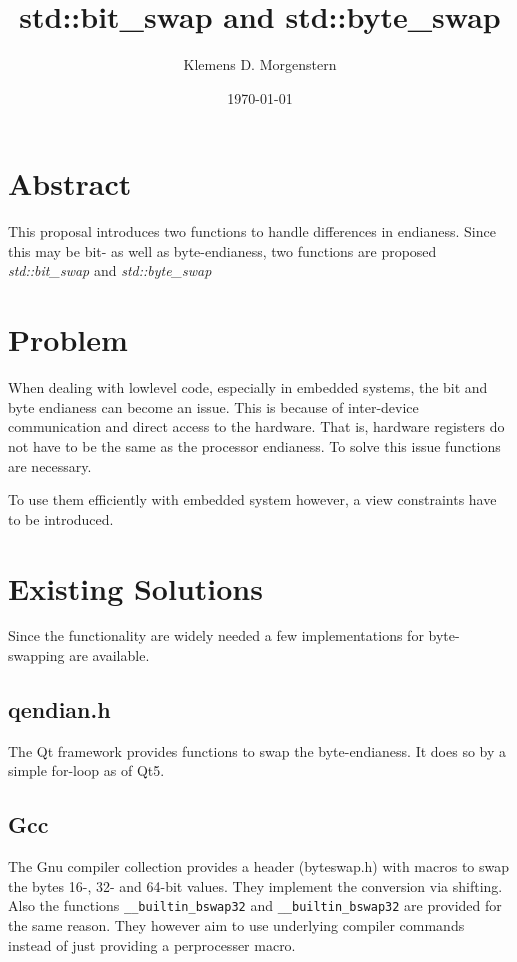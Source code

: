 \documentclass{article}
\begin{document}
\title{std::bit\_swap and std::byte\_swap}
\author{Klemens D. Morgenstern}
\date{\today}

\maketitle

\newpage
\section*{Abstract}

This proposal introduces two functions to handle differences in endianess. Since
this may be bit- as well as byte-endianess, two functions are proposed
\textit{std::bit\_swap} and \textit{std::byte\_swap}

\section{Problem}

When dealing with lowlevel code, especially in embedded systems, the bit and
byte endianess can become an issue. This is because of inter-device
communication and direct access to the hardware. That is, hardware registers do not have to
be the same as the processor endianess. To solve this issue functions are
necessary.

To use them efficiently with embedded system however, a view constraints have
to be introduced.

\section{Existing Solutions}
Since the functionality are widely needed a few implementations for
byte-swapping are available.

\subsection{qendian.h} 
The Qt framework provides functions to swap the byte-endianess. It does so by a
simple for-loop as of Qt5.

\subsection{Gcc}
The Gnu compiler collection provides a header (byteswap.h) with macros to swap
the bytes 16-, 32- and 64-bit values. They implement the conversion via shifting.
Also the functions \lstinline {__builtin_bswap32} and
\lstinline {__builtin_bswap32} are provided for the same reason. They however
aim to use underlying compiler commands instead of just providing a perprocesser
macro.
\end{document}
